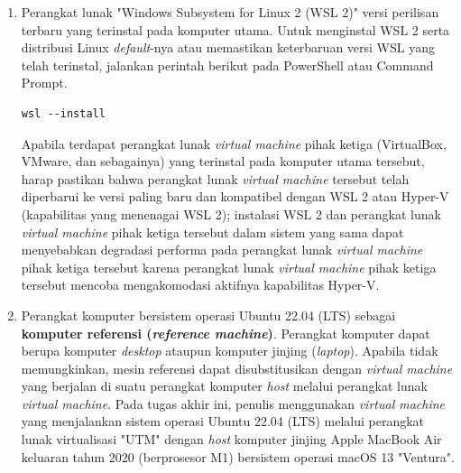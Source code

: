 \begin{enumerate}
    \item Perangkat lunak "Windows Subsystem for Linux 2 (WSL 2)" versi perilisan terbaru yang terinstal pada komputer utama. Untuk menginstal WSL 2 serta distribusi Linux \textit{default}-nya atau memastikan keterbaruan versi WSL yang telah terinstal, jalankan perintah berikut pada PowerShell atau Command Prompt.
    \begin{lstlisting}
wsl --install\end{lstlisting}
    Apabila terdapat perangkat lunak \textit{virtual machine} pihak ketiga (VirtualBox, VMware, dan sebagainya) yang terinstal pada komputer utama tersebut, harap pastikan bahwa perangkat lunak \textit{virtual machine} tersebut telah diperbarui ke versi paling baru dan kompatibel dengan WSL 2 atau Hyper-V (kapabilitas yang menenagai WSL 2); instalasi WSL 2 dan perangkat lunak \textit{virtual machine} pihak ketiga tersebut dalam sistem yang sama dapat menyebabkan degradasi performa pada perangkat lunak \textit{virtual machine} pihak ketiga tersebut karena perangkat lunak \textit{virtual machine} pihak ketiga tersebut mencoba mengakomodasi aktifnya kapabilitas Hyper-V.

    \item Perangkat komputer bersistem operasi Ubuntu 22.04 (LTS) sebagai \textbf{komputer referensi (\textit{reference machine})}. Perangkat komputer dapat berupa komputer \textit{desktop} ataupun komputer jinjing (\textit{laptop}). Apabila tidak memungkinkan, mesin referensi dapat disubstitusikan dengan \textit{virtual machine} yang berjalan di suatu perangkat komputer \textit{host} melalui perangkat lunak \textit{virtual machine}. Pada tugas akhir ini, penulis menggunakan \textit{virtual machine} yang menjalankan sistem operasi Ubuntu 22.04 (LTS) melalui perangkat lunak virtualisasi "UTM" dengan \textit{host} komputer jinjing Apple MacBook Air keluaran tahun 2020 (berprosesor M1) bersistem operasi macOS 13 "Ventura".


\end{enumerate}
